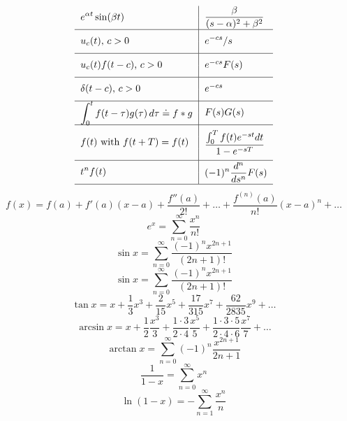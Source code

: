 \documentclass[10pt,driverfallback=hypertex]{report}
\begin{document}
{$$\begin{tabular}{ l |  l }
  \multirow{2}{*}{$\displaystyle e^{\a t}\sin(\b t)$}
  & \multirow{2}{*}{$\displaystyle \frac{\b}{(s-\a)^2 + \b^2}$} \\ \\ \hline
  \multirow{2}{*}{$\displaystyle u_c(t)$, $c > 0$}
  & \multirow{2}{*}{$\displaystyle {e^{-cs}}/{s}$} \\ \\ \hline
  \multirow{2}{*}{$u_c(t)f(t-c)$, $c > 0$}
  & \multirow{2}{*}{$e^{-cs}F(s)$} \\  \\ \hline
  \multirow{2}{*}{$\delta(t-c)$, $c > 0$}
  & \multirow{2}{*}{$e^{-cs}$} \\  \\ \hline
  \multirow{2}{*}{$\displaystyle \int_0^t f(t-\t)g(\t) \,d\t \doteq f*g$}
  & \multirow{2}{*}{$\displaystyle F(s)G(s)$} \\ \\ \hline
  \multirow{3}{*}{$\displaystyle f(t)$ with $\displaystyle f(t+T)=f(t)$}
  & \multirow{3}{*}{$\displaystyle \frac{\int_0^Tf(t) e^{-st}dt}{1-e^{-sT}}$}
  \\ \\ \\ \hline
  \multirow{2}{*}{$\displaystyle t^n f(t)$}
  & \multirow{2}{*}{$\displaystyle (-1)^n \frac{d^n}{ds^n} F(s)$} \\ \\ \hline
\end{tabular}\\
$$
}{ %
\begin{dmath*}
  f(x) = f(a) + f'(a)(x-a) + \frac{f''(a)}{2!} + \dots
  + \frac{f^{(n)}(a)}{n!}(x-a)^n + \dots
\end{dmath*}
\begin{dmath*}
  e^x = \sum_{n=0}^\infty \frac{x^n}{n!}
\end{dmath*}
\begin{dmath*}
  \sin x = \sum_{n=0}^\infty \frac{(-1)^n x^{2n+1}}{(2n+1)!}
\end{dmath*}
\begin{dmath*}
  \sin x = \sum_{n=0}^\infty \frac{(-1)^n x^{2n+1}}{(2n+1)!}
\end{dmath*}
\begin{dmath*}
  \tan x = x + \frac{1}{3}x^3 + \frac{2}{15}x^5 + \frac{17}{315}x^7
  + \frac{62}{2835}x^9 + \dots
\end{dmath*}
\begin{dmath*}
  \arcsin x = x + \frac{1}{2}\frac{x^3}{3}
  + \frac{1\cdot 3}{2\cdot 4}\frac{x^5}{5}
  + \frac{1\cdot3\cdot5}{2\cdot4\cdot6}\frac{x^7}{7} + \dots
\end{dmath*}
\begin{dmath*}
  \arctan x = \sum_{n=0}^\infty (-1)^n \frac{x^{2n+1}}{2n+1}
\end{dmath*}
\begin{dmath*}
  \frac{1}{1-x} = \sum_{n=0}^\infty x^n
\end{dmath*}
\begin{dmath*}
  \ln(1-x) = -\sum_{n=1}^\infty \frac{x^n}{n}
\end{dmath*}
}
\newpage
\end{document}
